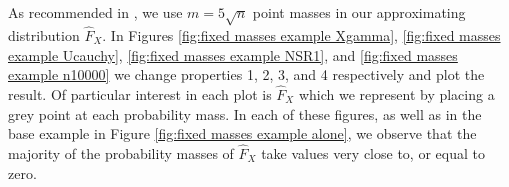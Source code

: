 	As recommended in \cite{Delaigle2016-la}, we use $m = 5\sqrt{n}$ point masses in our approximating distribution $\hat{F}_X$. In Figures \ref{fig:fixed masses example Xgamma}, \ref{fig:fixed masses example Ucauchy}, \ref{fig:fixed masses example NSR1}, and \ref{fig:fixed masses example n10000} we change properties 1, 2, 3, and 4 respectively and plot the result. Of particular interest in each plot is $\hat{F}_X$ which we represent by placing a grey point at each probability mass. In each of these figures, as well as in the base example in Figure \ref{fig:fixed masses example alone}, we observe that the majority of the probability masses of $\hat{F}_X$ take values very close to, or equal to zero.



